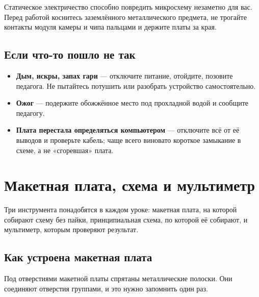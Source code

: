 \begin{caution}
Статическое электричество способно повредить микросхему незаметно для вас. Перед работой коснитесь
заземлённого металлического предмета, не трогайте контакты модуля камеры и чипа пальцами и держите
платы за края.
\end{caution}

\subsection*{Если что-то пошло не так}

\begin{itemize}
  \item \textbf{Дым, искры, запах гари} --- отключите питание, отойдите, позовите педагога. Не пытайтесь
        потушить или разобрать устройство самостоятельно.
  \item \textbf{Ожог} --- подержите обожжённое место под прохладной водой и сообщите педагогу.
  \item \textbf{Плата перестала определяться компьютером} --- отключите всё от её выводов и проверьте
        кабель; чаще всего виновато короткое замыкание в схеме, а не «сгоревшая» плата.
\end{itemize}

\section*{Макетная плата, схема и мультиметр}

Три инструмента понадобятся в каждом уроке: макетная плата, на которой собирают схему без пайки,
принципиальная схема, по которой её собирают, и мультиметр, которым проверяют результат.

\subsection*{Как устроена макетная плата}

Под отверстиями макетной платы спрятаны металлические полоски. Они соединяют отверстия группами, и это
нужно запомнить один раз.

